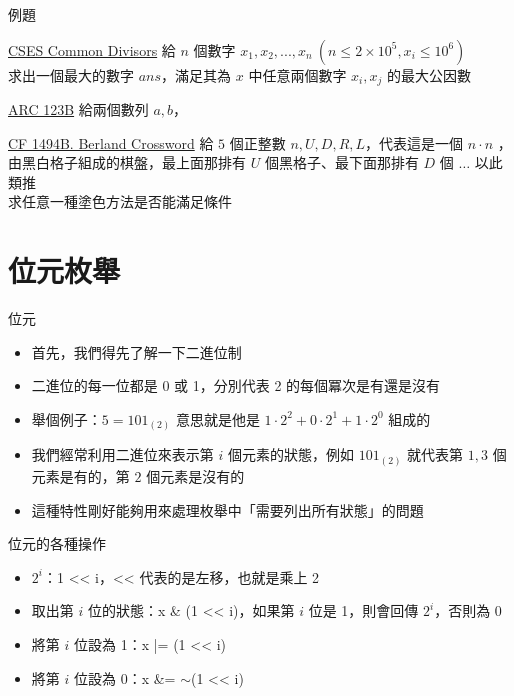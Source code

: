 \documentclass[aspectratio=169]{beamer}
\begin{document}
    \begin{frame}{例題}
        \begin{block}{\href{https://cses.fi/problemset/task/1081}{CSES Common Divisors}}
            給 $n$ 個數字 $x_1, x_2, ..., x_n\ (n \le 2 \times 10^5, x_i \le 10^6)$\\
            求出一個最大的數字 $ans$，滿足其為 $x$ 中任意兩個數字 $x_i, x_j$ 的最大公因數
        \end{block}

        \begin{block}{\href{https://atcoder.jp/contests/arc124/tasks/arc124_b}{ARC 123B}}
            給兩個數列 $a, b$， 
        \end{block}

        \begin{block}{\href{https://codeforces.com/problemset/problem/1494/B}{CF 1494B. Berland Crossword}}
            給 $5$ 個正整數 $n, U, D, R, L$，代表這是一個 $n \cdot n$ ，由黑白格子組成的棋盤，最上面那排有 $U$ 個黑格子、最下面那排有 $D$ 個 $\dots$ 以此類推\\
            求任意一種塗色方法是否能滿足條件
        \end{block}
        
        
    \end{frame}

    \section{位元枚舉}

    \begin{frame}{位元}
        \begin{itemize}
            \item<1-> 首先，我們得先了解一下二進位制
            \item<1-> 二進位的每一位都是 0 或 1，分別代表 2 的每個冪次是有還是沒有
            \item<1-> 舉個例子：$5 = 101_{(2)}$ 意思就是他是 $1 \cdot 2^2 + 0 \cdot 2^1 + 1 \cdot 2^0$ 組成的
            \item<2-> 我們經常利用二進位來表示第 $i$ 個元素的狀態，例如 $101_{(2)}$ 就代表第 $1, 3$ 個元素是有的，第 $2$ 個元素是沒有的
            \item<2-> 這種特性剛好能夠用來處理枚舉中「需要列出所有狀態」的問題
        \end{itemize}
    \end{frame}

    \begin{frame}{位元的各種操作}
        \begin{itemize}
            \item $2^i$：1 << i，<< 代表的是左移，也就是乘上 2
            \item 取出第 $i$ 位的狀態：x \& (1 << i)，如果第 $i$ 位是 1，則會回傳 $2^i$，否則為 $0$
            \item 將第 $i$ 位設為 1：x |= (1 << i)
            \item 將第 $i$ 位設為 0：x \&= $\sim$(1 << i)
        \end{itemize}
    \end{frame}
\end{document}
